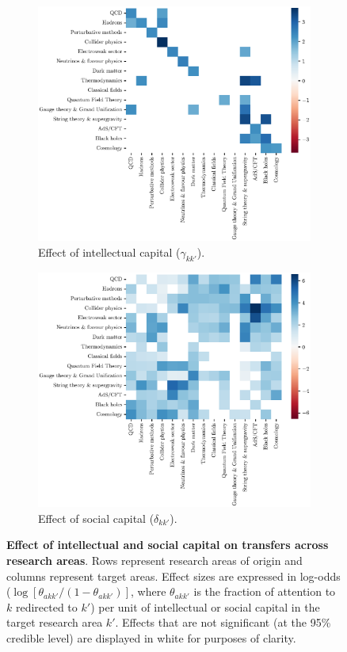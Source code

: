 \documentclass{article}
\begin{document}
\begin{figure}[H]
\begin{subfigure}{.5\textwidth}
    \includegraphics[width=1\textwidth]{Fig19a}
    \caption{Effect of intellectual capital ($\gamma_{kk'}$).}
    \label{fig:intellectual-capital-effect_2000-2009}
\end{subfigure}%
\begin{subfigure}{.5\textwidth}
    \includegraphics[width=1\textwidth]{Fig19b}
    \caption{Effect of social capital ($\delta_{kk'}$).}
    \label{fig:social-capital-effect_2000-2009}
\end{subfigure}
\caption{\textbf{Effect of intellectual and social capital on transfers across research areas}. Rows represent research areas of origin and columns represent target areas. Effect sizes are expressed in log-odds ($\log {[\theta_{akk'}/(1-\theta_{akk'})]}$, where $\theta_{akk'}$ is the fraction of attention to $k$ redirected to $k'$) per unit of intellectual or social capital in the target research area $k'$. Effects that are not significant (at the 95\% credible level) are displayed in white for purposes of clarity.}
\end{figure}
\end{document}

